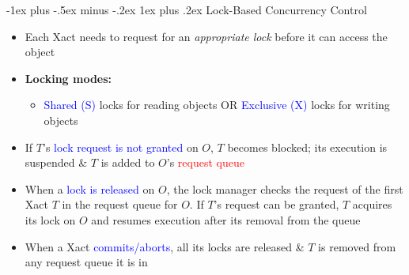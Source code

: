 \documentclass[10pt,landscape]{article}
\makeatletter
\newcommand{\subsubsubsection}{\@startsection{subsubsection}{3}{0mm}%
                                {-1ex plus -.5ex minus -.2ex}%
                                {1ex plus .2ex}%
                                {\normalfont\scriptsize\bfseries}}
\newcommand{\1}{\mathmybb{1}}
\makeatother
\begin{document}
\begin{multicols*}{3}
\subsubsubsection{Lock-Based Concurrency Control}
\begin{itemize}
  \item Each Xact needs to request for an \textit{appropriate lock} before it can access the object
  \item \textbf{Locking modes:}
  \begin{itemize}
    \item \textcolor{blue}{Shared (S)} locks for reading objects OR \textcolor{blue}{Exclusive (X)} locks for writing objects
  \end{itemize}
\end{itemize}



\begin{itemize}
    \item If $T$'s \textcolor{blue}{lock request is not granted} on $O$, $T$ becomes blocked; its execution is suspended \& $T$ is added to $O$'s \textcolor{red}{request queue}
    \item When a \textcolor{blue}{lock is released} on $O$, the lock manager checks the request of the first Xact $T$ in the request queue for $O$. If $T$'s request can be granted, $T$ acquires its lock on $O$ and resumes execution after its removal from the queue
    \item When a Xact \textcolor{blue}{commits/aborts}, all its locks are released \& $T$ is removed from any request queue it is in
\end{itemize}


\end{multicols*}
\end{document}
